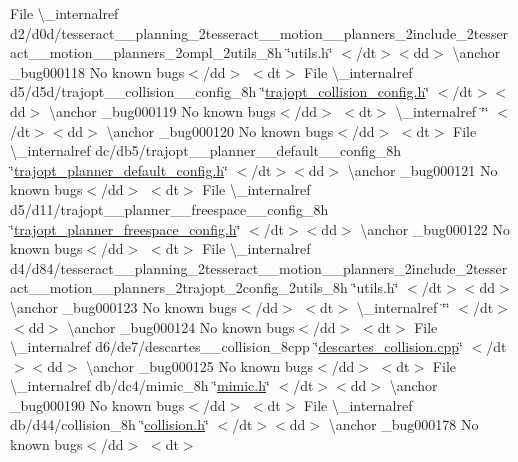 \begin{DoxyRefList}
\+File \textbackslash{}\+\_\+internalref d2/d0d/tesseract\+\_\+\+\_\+planning\+\_\+2tesseract\+\_\+\+\_\+motion\+\_\+\+\_\+planners\+\_\+2include\+\_\+2tesseract\+\_\+\+\_\+motion\+\_\+\+\_\+planners\+\_\+2ompl\+\_\+2utils\+\_\+8h \char`\"{}utils.\+h\char`\"{} $<$/dt$>$$<$dd$>$ \textbackslash{}anchor \+\_\+bug000118 No known bugs$<$/dd$>$ $<$dt$>$
\+File \textbackslash{}\+\_\+internalref d5/d5d/trajopt\+\_\+\+\_\+collision\+\_\+\+\_\+config\+\_\+8h \char`\"{}\mbox{\hyperlink{trajopt__collision__config_8h}{trajopt\+\_\+collision\+\_\+config.\+h}}\char`\"{} $<$/dt$>$$<$dd$>$ \textbackslash{}anchor \+\_\+bug000119 No known bugs$<$/dd$>$ $<$dt$>$
 \textbackslash{}\+\_\+internalref  \char`\"{}\char`\"{} $<$/dt$>$$<$dd$>$ \textbackslash{}anchor \+\_\+bug000120 No known bugs$<$/dd$>$ $<$dt$>$
\+File \textbackslash{}\+\_\+internalref dc/db5/trajopt\+\_\+\+\_\+planner\+\_\+\+\_\+default\+\_\+\+\_\+config\+\_\+8h \char`\"{}\mbox{\hyperlink{trajopt__planner__default__config_8h}{trajopt\+\_\+planner\+\_\+default\+\_\+config.\+h}}\char`\"{} $<$/dt$>$$<$dd$>$ \textbackslash{}anchor \+\_\+bug000121 No known bugs$<$/dd$>$ $<$dt$>$
\+File \textbackslash{}\+\_\+internalref d5/d11/trajopt\+\_\+\+\_\+planner\+\_\+\+\_\+freespace\+\_\+\+\_\+config\+\_\+8h \char`\"{}\mbox{\hyperlink{trajopt__planner__freespace__config_8h}{trajopt\+\_\+planner\+\_\+freespace\+\_\+config.\+h}}\char`\"{} $<$/dt$>$$<$dd$>$ \textbackslash{}anchor \+\_\+bug000122 No known bugs$<$/dd$>$ $<$dt$>$
\+File \textbackslash{}\+\_\+internalref d4/d84/tesseract\+\_\+\+\_\+planning\+\_\+2tesseract\+\_\+\+\_\+motion\+\_\+\+\_\+planners\+\_\+2include\+\_\+2tesseract\+\_\+\+\_\+motion\+\_\+\+\_\+planners\+\_\+2trajopt\+\_\+2config\+\_\+2utils\+\_\+8h \char`\"{}utils.\+h\char`\"{} $<$/dt$>$$<$dd$>$ \textbackslash{}anchor \+\_\+bug000123 No known bugs$<$/dd$>$ $<$dt$>$
 \textbackslash{}\+\_\+internalref  \char`\"{}\char`\"{} $<$/dt$>$$<$dd$>$ \textbackslash{}anchor \+\_\+bug000124 No known bugs$<$/dd$>$ $<$dt$>$
\+File \textbackslash{}\+\_\+internalref d6/de7/descartes\+\_\+\+\_\+collision\+\_\+8cpp \char`\"{}\mbox{\hyperlink{descartes__collision_8cpp}{descartes\+\_\+collision.\+cpp}}\char`\"{} $<$/dt$>$$<$dd$>$ \textbackslash{}anchor \+\_\+bug000125 No known bugs$<$/dd$>$ $<$dt$>$
\+File \textbackslash{}\+\_\+internalref db/dc4/mimic\+\_\+8h \char`\"{}\mbox{\hyperlink{mimic_8h}{mimic.\+h}}\char`\"{} $<$/dt$>$$<$dd$>$ \textbackslash{}anchor \+\_\+bug000190 No known bugs$<$/dd$>$ $<$dt$>$
\+File \textbackslash{}\+\_\+internalref db/d44/collision\+\_\+8h \char`\"{}\mbox{\hyperlink{collision_8h}{collision.\+h}}\char`\"{} $<$/dt$>$$<$dd$>$ \textbackslash{}anchor \+\_\+bug000178 No known bugs$<$/dd$>$ $<$dt$>$

\end{DoxyRefList}
